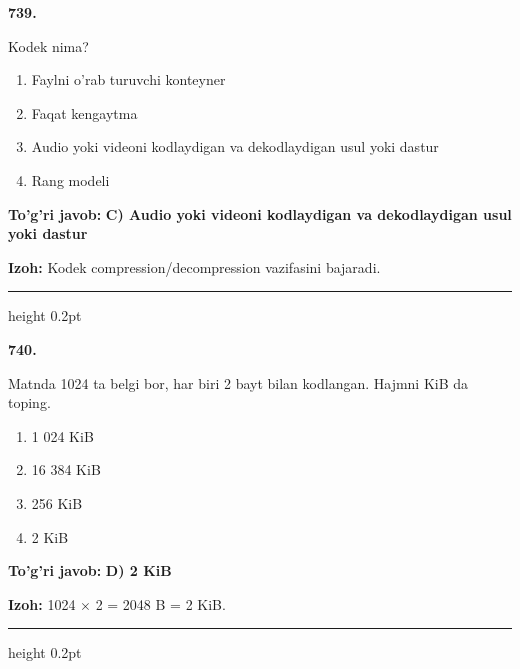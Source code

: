 \documentclass[10pt,a4paper,oneside]{article}
\begin{document}
\noindent\textbf{\color{ink}739.}
\par
Kodek nima?
\begin{enumerate}[label=\Alph*),leftmargin=9mm]
\item Faylni o'rab turuvchi konteyner
\item Faqat kengaytma
\item Audio yoki videoni kodlaydigan va dekodlaydigan usul yoki dastur
\item Rang modeli
\end{enumerate}
\begin{tcolorbox}[enhanced,breakable,colback=teal!4,colframe=teal!50!black,boxrule=0.5pt,arc=1.1mm,left=3mm,right=3mm,top=1.7mm,bottom=1.7mm,before skip=2mm,after skip=2mm]
\textbf{\color{teal}To'g'ri javob:} \textbf{C) Audio yoki videoni kodlaydigan va dekodlaydigan usul yoki dastur}
\par\smallskip
\textbf{Izoh:} Kodek compression/decompression vazifasini bajaradi.
\end{tcolorbox}
\vspace{2mm}\hrule height 0.2pt \vspace{3mm}

\noindent\textbf{\color{ink}740.}
\par
Matnda 1024 ta belgi bor, har biri 2 bayt bilan kodlangan. Hajmni KiB da toping.
\begin{enumerate}[label=\Alph*),leftmargin=9mm]
\item 1 024 KiB
\item 16 384 KiB
\item 256 KiB
\item 2 KiB
\end{enumerate}
\begin{tcolorbox}[enhanced,breakable,colback=teal!4,colframe=teal!50!black,boxrule=0.5pt,arc=1.1mm,left=3mm,right=3mm,top=1.7mm,bottom=1.7mm,before skip=2mm,after skip=2mm]
\textbf{\color{teal}To'g'ri javob:} \textbf{D) 2 KiB}
\par\smallskip
\textbf{Izoh:} 1024 \ensuremath{\times} 2 = 2048 B = 2 KiB.
\end{tcolorbox}
\vspace{2mm}\hrule height 0.2pt \vspace{3mm}
\end{document}
